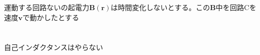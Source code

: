 \documentclass{jsarticle}
\begin{document}
\subsection{}
	運動する回路ないの起電力$\bm{B}(\bm{r})$は時間変化しないとする。この$\bm{B}$中を回路Cを速度$\bm{v}$で動かしたとする
\section{}
	自己インダクタンスはやらない
\end{document}
